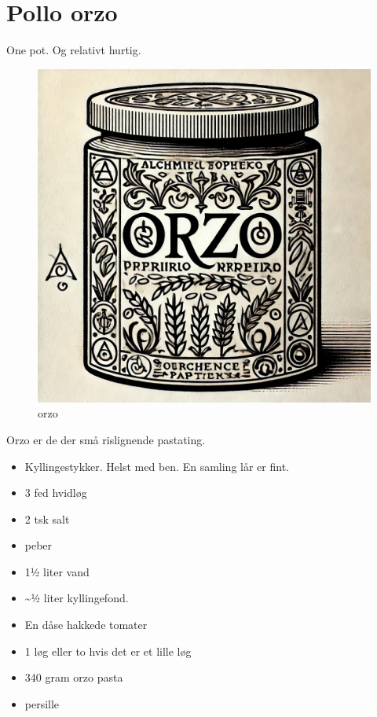 \documentclass[
]{book}
\providecommand{\tightlist}{%
  \setlength{\itemsep}{0pt}\setlength{\parskip}{0pt}}
\begin{document}
\hypertarget{pollo-orzo}{%
\section{Pollo orzo}\label{pollo-orzo}}

One pot. Og relativt hurtig.

\begin{figure}
\centering
\includegraphics{images/orzo.png}
\caption{orzo}
\end{figure}

Orzo er de der små rislignende pastating.

\begin{itemize}
\tightlist
\item
  Kyllingestykker. Helst med ben. En samling lår er fint.
\item
  3 fed hvidløg
\item
  2 tsk salt
\item
  peber
\item
  1½ liter vand
\item
  \textasciitilde½ liter kyllingefond.
\item
  En dåse hakkede tomater
\item
  1 løg eller to hvis det er et lille løg
\item
  340 gram orzo pasta
\item
  persille
\end{itemize}
\end{document}
